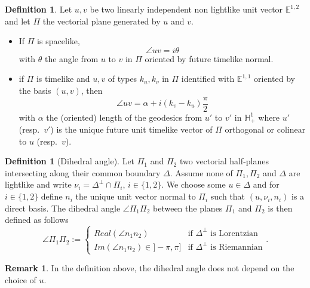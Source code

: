 \documentclass[a4paper,12pt]{article}
\def\H{\mathbb{H}}
\def\E{\mathbf E}
\def\E{\mathbb{E}}
\newcommand{\mass}[1]{{\mathbb E}^{1,2}_{#1}}
\def\E{\mathbb{E}}
\theoremstyle{definition}
\newtheorem{defi}[lem]{Definition}	%
\newtheorem*{rem}{Remark}			 %
\begin{document}
					\begin{defi}\label{def:two_linearly_independent_non} Let $u,v$ be two linearly independent non lightlike unit vector $\mass{}$ and let $\Pi$ the vectorial plane generated by $u$
					and $v$.
					\begin{itemize}
					 \item If $\Pi$ is spacelike, $$\angle uv=i\theta$$ with $\theta$ the angle from $u$ to $v$ in $\Pi$ oriented by future timelike normal.
					 \item if $\Pi$ is timelike and $u,v$ of types $k_u,k_v$ in $\Pi$ identified with $\E^{1,1}$ oriented by the basis $(u,v)$, then
					 $$\angle uv=\alpha+i(k_v-k_u)\frac{\pi}{2}$$
					 with $\alpha$ the (oriented) length of the geodesics from $u'$ to $v'$ in $\H^1_+$ where $u'$ (resp.\ $v'$) is the unique future unit timelike vector of $\Pi$ orthogonal or colinear to $u$ (resp.\ $v$).
					\end{itemize}


					\end{defi}

					\begin{defi}[Dihedral angle]\label{def:dihedral_angle}
					Let $\Pi_1$ and $\Pi_2$ two vectorial half-planes intersecting along their common boundary $\Delta$.
					Assume none of $\Pi_1,\Pi_2$ and $\Delta$ are lightlike and write $\nu_i=\Delta^\perp\cap\Pi_i$, $i\in \{1,2\}$.
					We choose some $u\in \Delta$ and for $i\in \{1,2\}$ define $n_i$ the unique unit vector normal to $\Pi_i$ such that $(u,\nu_i,n_i)$ is a direct basis.
					The  dihedral angle $\angle \Pi_1\Pi_2$ between the planes $\Pi_1$ and $\Pi_2$ is then defined as 
					 follows 
					$$\angle \Pi_1\Pi_2:= \left\{\begin{array}{ll}
					                               Real(\angle n_1n_2) & \text{if } \Delta^\perp \text{ is Lorentzian} \\ 
                                                 Im(\angle n_1n_2) \in ]-\pi,\pi] & \text{if } \Delta^\perp \text{ is Riemannian} 
					                             \end{array}
\right.. $$
                    
					\end{defi}
					\begin{rem}\label{rem:definition_above_dihedral_angle}
					In the definition above, the dihedral angle does not depend on the choice of $u$. 
					\end{rem}
\end{document}
